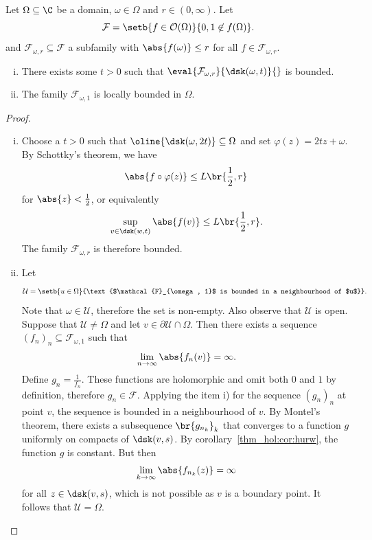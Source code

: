 
\begin{lema}
Let $\Omega \subseteq \C$ be a domain, $\omega \in \Omega$ and
$r \in (0, \infty)$. Let
\[
\mathcal{F} =
\setb{f \in \mathcal{O}(\Omega)}{0, 1 \not \in f(\Omega)}.
\]
and $\mathcal{F}_{\omega,r} \subseteq \mathcal{F}$ a subfamily with
$\abs{f(\omega)} \leq r$ for all $f \in \mathcal{F}_{\omega,r}$.

\begin{enumerate}[i)]
\item There exists some $t > 0$ such that
$\eval{\mathcal{F}_{\omega,r}}{\dsk(\omega,t)}{}$ is bounded.
\item The family $\mathcal{F}_{\omega,1}$ is locally bounded in
$\Omega$.
\end{enumerate}
\end{lema}

\begin{proof}
\phantom{a}
\begin{enumerate}[i)]
\item Choose a $t > 0$ such that
$\oline{\dsk(\omega, 2t)} \subseteq \Omega$ and set
$\varphi(z) = 2tz + \omega$. By Schottky's theorem, we have
\[
\abs{f \circ \varphi(z)} \leq L \br{\frac{1}{2}, r}
\]
for $\abs{z} < \frac{1}{2}$, or equivalently
\[
\sup_{v \in \dsk(w, t)} \abs{f(v)} \leq L \br{\frac{1}{2}, r}.
\]
The family $\mathcal{F}_{\omega, r}$ is therefore bounded.

\item Let
\[
\mathcal{U} =
\setb{u \in \Omega}
{\text{$\mathcal{F}_{\omega, 1}$ is bounded in a neighbourhood of
$u$}}.
\]
Note that $\omega \in \mathcal{U}$, therefore the set is non-empty.
Also observe that $\mathcal{U}$ is open. Suppose that
$\mathcal{U} \ne \Omega$ and let
$v \in \partial \mathcal{U} \cap \Omega$. Then there exists a
sequence
$(f_n)_n \subseteq \mathcal{F}_{\omega, 1}$ such that
\[
\lim_{n \to \infty} \abs{f_n(v)} = \infty.
\]
Define $g_n = \frac{1}{f_n}$. These functions are holomorphic and
omit both $0$ and $1$ by definition, therefore
$g_n \in \mathcal{F}$. Applying the item i) for the sequence
$(g_n)_n$ at point $v$, the sequence is bounded in a neighbourhood
of $v$. By Montel's theorem, there exists a subsequence
$\br{g_{n_k}}_k$ that converges to a function $g$ uniformly on
compacts of $\dsk(v, s)$. By corollary~\ref{thm_hol:cor:hurw},
the function $g$ is constant. But then
\[
\lim_{k \to \infty} \abs{f_{n_k}(z)} = \infty
\]
for all $z \in \dsk(v, s)$, which is not possible as $v$ is a
boundary point. It follows that $\mathcal{U} = \Omega$. \qedhere
\end{enumerate}
\end{proof}

